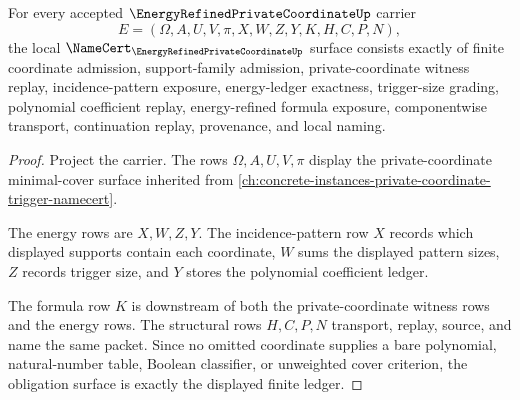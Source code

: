 \begin{theorem}
\label{thm:energy-refined-private-coordinate-namecert-obligations}
For every accepted $\EnergyRefinedPrivateCoordinateUp$ carrier
$$
E=(\Omega,A,U,V,\pi,X,W,Z,Y,K,H,C,P,N),
$$
the local $\NameCert_{\EnergyRefinedPrivateCoordinateUp}$ surface consists exactly of finite coordinate admission, support-family admission, private-coordinate witness replay, incidence-pattern exposure, energy-ledger exactness, trigger-size grading, polynomial coefficient replay, energy-refined formula exposure, componentwise transport, continuation replay, provenance, and local naming.
\end{theorem}
\begin{proof}
Project the carrier. The rows $\Omega,A,U,V,\pi$ display the private-coordinate minimal-cover surface inherited from \autoref{ch:concrete-instances-private-coordinate-trigger-namecert}.

The energy rows are $X,W,Z,Y$. The incidence-pattern row $X$ records which displayed supports contain each coordinate, $W$ sums the displayed pattern sizes, $Z$ records trigger size, and $Y$ stores the polynomial coefficient ledger.

The formula row $K$ is downstream of both the private-coordinate witness rows and the energy rows. The structural rows $H,C,P,N$ transport, replay, source, and name the same packet. Since no omitted coordinate supplies a bare polynomial, natural-number table, Boolean classifier, or unweighted cover criterion, the obligation surface is exactly the displayed finite ledger.
\end{proof}

